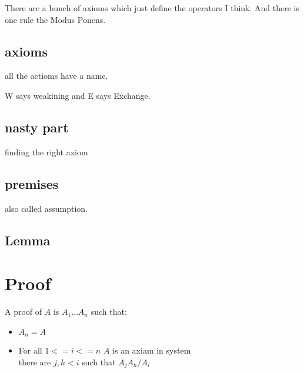 \documentclass{report}
\begin{document}
There are a bunch of axioms which just define the operators I think.
And there is one rule the Modus Ponens.

\subsection{axioms}

all the actioms have a name.

W says weakining and E says Exchange.

\subsection{nasty part}

finding the right axiom

\subsection{premises}
also called assumption.

\subsection{Lemma}



\section{Proof}
A proof of $A$ is $A_1 \dots A_n$ such that:
\begin{itemize}
	\item $A_n=A$
	\item For all $1<= i <= n$ $A$ is an axiam in system \\
		there are $j,h<i$ such that $A_j A_h / A_i$
\end{itemize}
\end{document}
